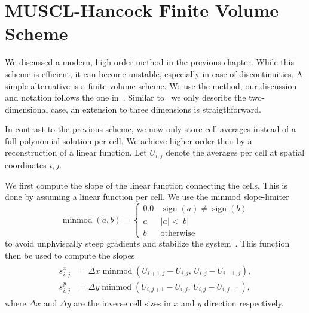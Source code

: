 \section{MUSCL-Hancock Finite Volume Scheme}\label{sec:muscl}
\newcommand{\cellAvg}[1][i,j]{U_{#1}}
\newcommand{\sign}{\operatorname{sign}}
\newcommand{\minmod}{\operatorname{minmod}}
\newcommand{\slope}[2][i,j]{s^{#2}_{#1}}
\newcommand{\gradCellAvg}[1][i,j]{\gradient{\cellAvg[#1]}}
\newcommand{\fluxX}{\flux_x}
\newcommand{\fluxY}{\flux_y}
We discussed a modern, high-order \dg{} method in the previous chapter.
While this scheme is efficient, it can become unstable, especially in case of discontinuities.
A simple alternative is a finite volume scheme.
We use the \muscl{} method, our discussion and notation follows the one in~\cite{toro2009riemann}.
Similar to~\cite{toro2009riemann} we only describe the two-dimensional case, an extension to three dimensions is straigthforward.

In contrast to the previous \dg{} scheme, we now only store cell averages instead of a full polynomial solution per cell.
We achieve higher order then by a reconstruction of a linear function.
Let $\cellAvg$ denote the averages per cell at spatial coordinates $i,j$.

We first compute the slope of the linear function connecting the cells.
This is done by assuming a linear function per cell.
We use the minmod slope-limiter
\begin{equation}
  \label{eq:minmod}
  \operatorname{minmod}(a, b) =
  \begin{cases}
    0.0 & \sign(a) \neq \sign(b) \\
      a & \vert a \vert < \vert b \vert \\
      b & \text{otherwise}
  \end{cases}
\end{equation}
to avoid unphyiscally steep gradients and stabilize the system~\cite{leVeque2002finite}.
This function then be used to compute the slopes
\begin{align}\label{eq:slopes}
  \begin{split}
   \slope{x} &=  \Delta x \minmod \left( \cellAvg[i+1,j] - \cellAvg[i,j], \, \cellAvg[i,j] - \cellAvg[i-1, j] \right),\\ 
   \slope{y} &=  \Delta y \minmod \left( \cellAvg[i,j+1] - \cellAvg[i,j], \, \cellAvg[i,j] - \cellAvg[i, j-1] \right),
   \end{split}
\end{align}
where $\Delta x$ and $\Delta y$ are the inverse cell sizes in $x$ and $y$ direction respectively.

